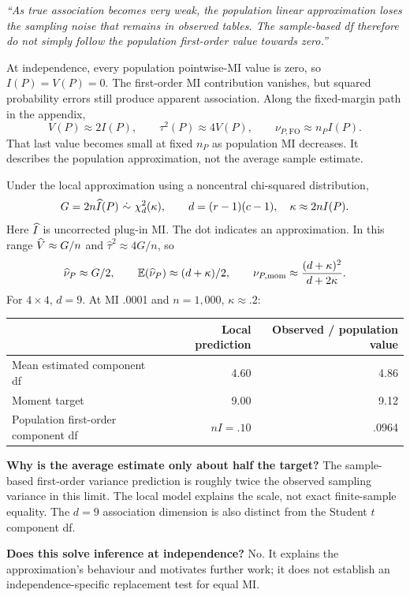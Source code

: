 \emph{``As true association becomes very weak, the population linear approximation loses the sampling noise that remains in observed tables. The sample-based df therefore do not simply follow the population first-order value towards zero.''}

At independence, every population pointwise-MI value is zero, so \(I(P)=V(P)=0\). The first-order MI contribution vanishes, but squared probability errors still produce apparent association. Along the fixed-margin path in the appendix,
\[
V(P)\approx2I(P),\qquad\tau^2(P)\approx4V(P),
\qquad\nu_{P,\mathrm{FO}}\approx n_PI(P).
\]
That last value becomes small at fixed \(n_P\) as population MI decreases. It describes the population approximation, not the average sample estimate.

Under the local approximation using a noncentral chi-squared distribution,
\[
G=2n\Ihat(P)\ \dot\sim\ \chi_d^2(\kappa),\qquad
d=(r-1)(c-1),\quad\kappa\approx2nI(P).
\]
Here \(\widehat I\) is uncorrected plug-in MI. The dot indicates an approximation. In this range \(\widehat V\approx G/n\) and \(\widehat\tau^2\approx4G/n\), so
\[
\widehat\nu_P\approx G/2,\qquad
\mathbb E(\widehat\nu_P)\approx(d+\kappa)/2,\qquad
\nu_{P,\mathrm{mom}}\approx\frac{(d+\kappa)^2}{d+2\kappa}.
\]
For \(4\times4\), \(d=9\). At MI .0001 and \(n=1{,}000\), \(\kappa\approx.2\):
\begin{center}
\begin{tabular}{@{}lrr@{}}
\toprule
 & \textbf{Local prediction} & \textbf{Observed / population value}\\
\midrule
Mean estimated component df & 4.60 & 4.86\\
Moment target & 9.00 & 9.12\\
Population first-order component df & \(nI=.10\) & .0964\\
\bottomrule
\end{tabular}
\end{center}

\textbf{Why is the average estimate only about half the target?} The sample-based first-order variance prediction is roughly twice the observed sampling variance in this limit. The local model explains the scale, not exact finite-sample equality. The \(d=9\) association dimension is also distinct from the Student \(t\) component df.

\textbf{Does this solve inference at independence?} No. It explains the approximation's behaviour and motivates further work; it does not establish an independence-specific replacement test for equal MI.

